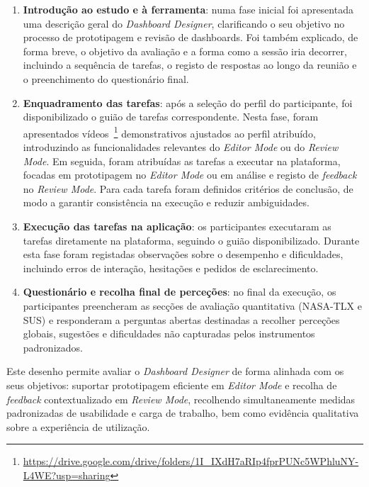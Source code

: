\begin{enumerate}
    \item \textbf{Introdução ao estudo e à ferramenta}: numa fase inicial foi apresentada uma descrição geral do \textit{Dashboard Designer}, clarificando o seu objetivo no processo de prototipagem e revisão de dashboards. Foi também explicado, de forma breve, o objetivo da avaliação e a forma como a sessão iria decorrer, incluindo a sequência de tarefas, o registo de respostas ao longo da reunião e o preenchimento do questionário final.

    \item \textbf{Enquadramento das tarefas}: após a seleção do perfil do participante, foi disponibilizado o guião de tarefas correspondente. Nesta fase, foram apresentados vídeos~\footnote{\url{https://drive.google.com/drive/folders/1I_IXdH7aRIp4fprPUNc5WPhluNY-L4WE?usp=sharing}} demonstrativos ajustados ao perfil atribuído, introduzindo as funcionalidades relevantes do \textit{Editor Mode} ou do \textit{Review Mode}. Em seguida, foram atribuídas as tarefas a executar na plataforma, focadas em prototipagem no \textit{Editor Mode} ou em análise e registo de \textit{feedback} no \textit{Review Mode}. Para cada tarefa foram definidos critérios de conclusão, de modo a garantir consistência na execução e reduzir ambiguidades.

    \item \textbf{Execução das tarefas na aplicação}: os participantes executaram as tarefas diretamente na plataforma, seguindo o guião disponibilizado. Durante esta fase foram registadas observações sobre o desempenho e dificuldades, incluindo erros de interação, hesitações e pedidos de esclarecimento.
    
    \item \textbf{Questionário e recolha final de perceções}: no final da execução, os participantes preencheram as secções de avaliação quantitativa (NASA-TLX e SUS) e responderam a perguntas abertas destinadas a recolher perceções globais, sugestões e dificuldades não capturadas pelos instrumentos padronizados.
\end{enumerate}

Este desenho permite avaliar o \textit{Dashboard Designer} de forma alinhada com os seus objetivos: suportar prototipagem eficiente em \textit{Editor Mode} e recolha de \textit{feedback} contextualizado em \textit{Review Mode}, recolhendo simultaneamente medidas padronizadas de usabilidade e carga de trabalho, bem como evidência qualitativa sobre a experiência de utilização.

